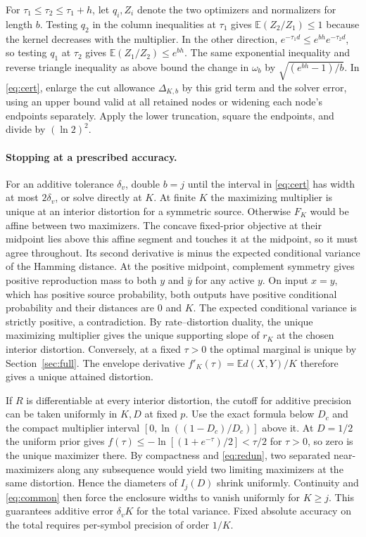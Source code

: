 \documentclass[11pt,letterpaper]{article}
\theoremstyle{definition}
\newcommand{\E}{\mathbb E}
\begin{document}
For $\tau_1\le\tau_2\le\tau_1+h$, let $q_i,Z_i$ denote the two optimizers and normalizers for length $b$. Testing $q_2$ in the column inequalities at $\tau_1$ gives $\E(Z_2/Z_1)\le1$ because the kernel decreases with the multiplier. In the other direction, $e^{-\tau_1 d}\le e^{bh}e^{-\tau_2 d}$, so testing $q_1$ at $\tau_2$ gives $\E(Z_1/Z_2)\le e^{bh}$. The same exponential inequality and reverse triangle inequality as above bound the change in $\omega_b$ by $\sqrt{(e^{bh}-1)/b}$. In \eqref{eq:cert}, enlarge the cut allowance $\Delta_{K,b}$ by this grid term and the solver error, using an upper bound valid at all retained nodes or widening each node's endpoints separately. Apply the lower truncation, square the endpoints, and divide by $(\ln 2)^2$.

\paragraph{Stopping at a prescribed accuracy.}
For an additive tolerance $\delta_v$, double $b=j$ until the interval in \eqref{eq:cert} has width at most $2\delta_v$, or solve directly at $K$. At finite $K$ the maximizing multiplier is unique at an interior distortion for a symmetric source. Otherwise $F_K$ would be affine between two maximizers. The concave fixed-prior objective at their midpoint lies above this affine segment and touches it at the midpoint, so it must agree throughout. Its second derivative is minus the expected conditional variance of the Hamming distance. At the positive midpoint, complement symmetry gives positive reproduction mass to both $y$ and $\bar y$ for any active $y$. On input $x=y$, which has positive source probability, both outputs have positive conditional probability and their distances are $0$ and $K$. The expected conditional variance is strictly positive, a contradiction. By rate--distortion duality, the unique maximizing multiplier gives the unique supporting slope of $r_K$ at the chosen interior distortion. Conversely, at a fixed $\tau>0$ the optimal marginal is unique by Section~\ref{sec:full}. The envelope derivative $f'_K(\tau)=\E d(X,Y)/K$ therefore gives a unique attained distortion.

If $R$ is differentiable at every interior distortion, the cutoff for additive precision can be taken uniformly in $K,D$ at fixed $p$. Use the exact formula below $D_c$ and the compact multiplier interval $[0,\ln((1-D_c)/D_c)]$ above it. At $D=1/2$ the uniform prior gives $f(\tau)\le-\ln[(1+e^{-\tau})/2]<\tau/2$ for $\tau>0$, so zero is the unique maximizer there. By compactness and \eqref{eq:redun}, two separated near-maximizers along any subsequence would yield two limiting maximizers at the same distortion. Hence the diameters of $I_j(D)$ shrink uniformly. Continuity and \eqref{eq:common} then force the enclosure widths to vanish uniformly for $K\ge j$. This guarantees additive error $\delta_v K$ for the total variance. Fixed absolute accuracy on the total requires per-symbol precision of order $1/K$.
\end{document}
